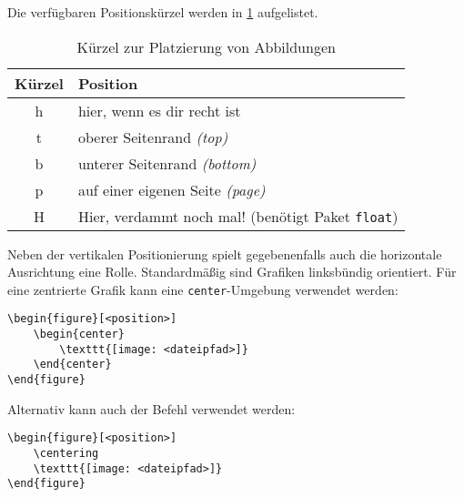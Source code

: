 \noindent Die verfügbaren Positionskürzel werden in \cref{tbl:positionskuerzel} aufgelistet.

\begin{table}[h!]
	\center
	\begin{tabular}{cl}
		\toprule
		Kürzel & Position                              \\
		\midrule
		h      & hier, wenn es dir recht ist           \\
		t      & oberer Seitenrand \emph{(top)}        \\
		b      & unterer Seitenrand \emph{(bottom)}    \\
		p      & auf einer eigenen Seite \emph{(page)} \\
		H      & Hier, verdammt noch mal! (benötigt Paket \texttt{float}) \\
		\bottomrule
	\end{tabular}
	\caption{Kürzel zur Platzierung von Abbildungen}
	\label{tbl:positionskuerzel}
\end{table}

Neben der vertikalen Positionierung spielt gegebenenfalls auch die horizontale Ausrichtung eine Rolle. Standardmäßig sind Grafiken linksbündig orientiert. Für eine zentrierte Grafik kann eine \texttt{center}-Umgebung verwendet werden:

\begin{verbatim}
\begin{figure}[<position>]
	\begin{center}
    	\texttt{[image: <dateipfad>]}
	\end{center}
\end{figure}
\end{verbatim}

\noindent Alternativ kann auch der Befehl \texttt{\centering} verwendet werden:

\begin{verbatim}
\begin{figure}[<position>]
	\centering
	\texttt{[image: <dateipfad>]}
\end{figure}
\end{verbatim}


